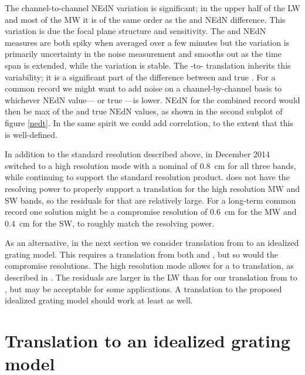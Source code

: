 \documentclass[journal]{IEEEtran}
\begin{document}
The {\airs} channel-to-channel NEdN variation is significant; in the
upper half of the LW and most of the MW it is of the same order as
the {\airs} and {\cris} NEdN difference.  This variation is due the
{\airs} focal plane structure and sensitivity.  The {\airs} and
{\cris} NEdN measures are both spiky when averaged over a few
minutes but the {\cris} variation is primarily uncertainty in the
noise measurement and smooths out as the time span is extended,
while the {\airs} variation is stable.  The {\airs}-to-{\cris}
translation inherits this variability; it is a significant part of
the difference between {\airs} {\cris} and true {\cris}.  For a
common record we might want to add noise on a channel-by-channel
basis to whichever NEdN value---{\airs} {\cris} or true {\cris}---is
lower.  NEdN for the combined record would then be max of the
{\airs} {\cris} and true {\cris} NEdN values, as shown in the second
subplot of figure \ref{nedt}.  In the same spirit we could add
{\airs} correlation, to the extent that this is well-defined.

In addition to the standard resolution described above, in December
2014 {\cris} switched to a high resolution mode with a nominal
{\opd} of $0.8$~cm for all three bands, while continuing to support
the standard resolution product.  {\airs} does not have the
resolving power to properly support a translation for the {\cris}
high resolution MW and SW bands, so the residuals for that are
relatively large.  For a long-term common record one solution might
be a compromise {\cris} resolution of $0.6$~cm for the MW and
$0.4$~cm for the SW, to roughly match the {\airs} resolving power.

As an alternative, in the next section we consider translation from
{\airs} to an idealized grating model.  This requires a translation
from both {\airs} and {\cris}, but so would the compromise {\cris}
resolutions.  The {\cris} high resolution mode allows for a {\cris}
to {\airs} translation, as described in \cite{git:decon}.  The
residuals are larger in the LW than for our translation from {\airs}
to {\cris}, but may be acceptable for some applications.  A {\cris}
translation to the proposed idealized grating model should work at
least as well.

\section{Translation to an idealized grating model}
\label{airsL1d}
\end{document}

